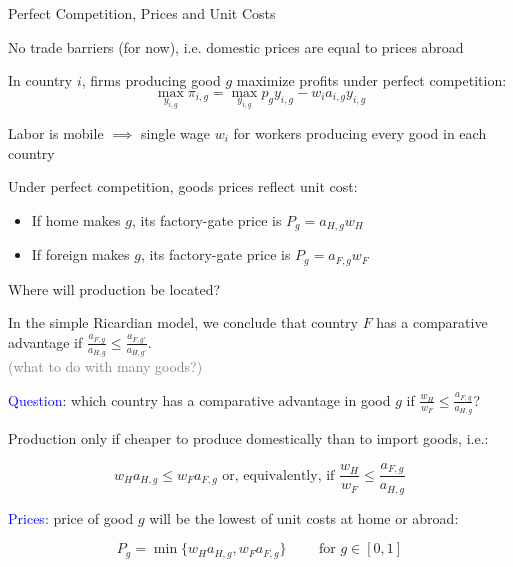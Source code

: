\documentclass[notes,11pt, aspectratio=169, xcolor=table]{beamer}
\newcommand{\blue}[1]{\textcolor{blue}{#1}}
\newenvironment{wideitemize}{\itemize\addtolength{\itemsep}{10pt}}{\enditemize}
\begin{document}
\begin{frame}{Perfect Competition, Prices and Unit Costs}
\begin{wideitemize}
        \item<1-> No trade barriers (for now), i.e. domestic prices are equal to prices abroad
        \item In country $i$, firms producing good $g$ maximize profits under perfect competition:
        \begin{equation*}
            \max_{y_{i,g}} \pi_{i,g} = \max_{y_{i,g}} p_{g} y_{i,g} - w_i a_{i,g} y_{i,g} 
        \end{equation*}

        \item<2-> Labor is mobile $\implies$ single wage $w_i$ for workers producing every good in each country 

        \item<3-> Under perfect competition, goods prices reflect unit cost:
        \begin{itemize}
            \item If home makes $g$, its factory-gate price is $P_g = a_{H,g} w_{H}$
            \item If foreign makes $g$, its factory-gate price is $P_g = a_{F,g} w_{F}$
        \end{itemize}
        \end{wideitemize}
\end{frame}

\begin{frame}{Where will production be located?}
\begin{wideitemize}
    \item<1-> In the simple Ricardian model, we conclude that country $F$ has a comparative advantage if $\frac{a_{F,g}}{a_{H,g}} \le  \frac{a_{F,g'}}{a_{H,g'}}$. \\
    \qquad \textcolor{gray}{(what to do with many goods?)}

    \item<2-> \blue{Question}: which country has a comparative advantage in good $g$ if $\frac{w_H}{w_F} \le  \frac{a_{F,g}}{a_{H,g}}$?

    \item<3-> Production only if cheaper to produce domestically than to import goods, i.e.:

    \begin{equation*}
        w_H a_{H,g} \le w_F a_{F,g} \text{ or, equivalently, if } \frac{w_H}{w_F} \le  \frac{a_{F,g}}{a_{H,g}}
    \end{equation*}

    \item<4-> \blue{Prices}: price of good $g$ will be the lowest of unit costs at home or abroad:


        \begin{equation*}
            P_{g} = \min\{w_H a_{H,g}, w_F a_{F,g}\}  \qquad \text{ for } g \in [0,1]
        \end{equation*}
        
        \end{wideitemize}
\end{frame}
\end{document}
